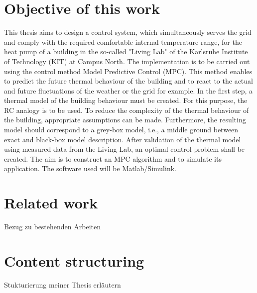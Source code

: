 \section{Objective of this work}
\label{section:obejective}
This thesis aims to design a control system, which simultaneously serves the grid and comply with the required comfortable internal temperature range, for the heat pump of a building in the so-called "Living Lab" of the Karlsruhe Institute of Technology (KIT) at Campus North. The implementation is to be carried out using the control method Model Predictive Control (MPC). This method enables to predict the future thermal behaviour of the building and to react to the actual and future fluctuations of the weather or the grid for example. 
In the first step, a thermal model of the building behaviour must be created. For this purpose, the RC analogy is to be used. To reduce the complexity of the thermal behaviour of the building, appropriate assumptions can be made. Furthermore, the resulting model should correspond to a grey-box model, i.e., a middle ground between exact and black-box model description. After validation of the thermal model using measured data from the Living Lab, an optimal control problem shall be created. The aim is to construct an MPC algorithm and to simulate its application. The software used will be Matlab/Simulink.

\section{Related work}
\label{section:relatedwork}
Bezug zu bestehenden Arbeiten
\section{Content structuring}
\label{section:contentstructuring}
Stukturierung meiner Thesis erläutern

%
%
%
